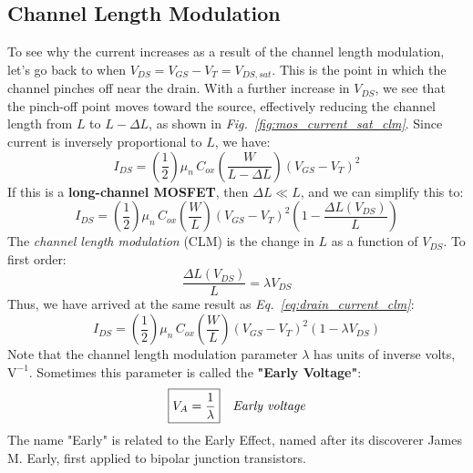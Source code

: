 \subsection{Channel Length Modulation} \label{sec:mos_clm}
To see why the current increases as a result of the channel length modulation, let's go back to when $V_{DS} = V_{GS} - V_T = V_{DS,sat}$.  This is the point in which the channel pinches off near the drain.  With a further increase in $V_{DS}$, we see that the pinch-off point moves toward the source, effectively reducing the channel length from $L$ to $L-\Delta L$, as shown in \emph{Fig.~\ref{fig:mos_current_sat_clm}}.  Since current is inversely proportional to $L$, we have:
    \begin{equation} 
        I_{DS} = \left(\frac{1}{2}\right) \mu_n\,C_{ox} \left(\frac{W}{L - \Delta L}\right) {\left( {V_{GS} - V_T} \right)}^2
    \end{equation}
If this is a \textbf{long-channel MOSFET}, then $\Delta L \ll L$, and we can simplify this to:
    \begin{equation} 
        I_{DS} = \left(\frac{1}{2}\right) \mu_n\,C_{ox} \left(\frac{W}{L}\right)
                    {\left({V_{GS} - V_T}\right)}^2 \left(1 - \frac{\Delta L(V_{DS})}{L}\right)
    \end{equation}
The \textit{channel length modulation} (CLM) is the change in $L$ as a function of $V_{DS}$.  To first order:
    \begin{equation} 
        \frac{\Delta L(V_{DS})}{L} = \lambda V_{DS}
    \end{equation}
Thus, we have arrived at the same result as \emph{Eq.~\ref{eq:drain_current_clm}}:
    \begin{equation} 
        I_{DS} = \left(\frac{1}{2}\right) \mu_n\,C_{ox} \left(\frac{W}{L}\right)
                    {\left({V_{GS} - V_T} \right)}^2 \left(1 - \lambda V_{DS}\right)
    \end{equation}
Note that the channel length modulation parameter $\lambda$ has units of inverse volts, $\mathrm{V^{-1}}$.  Sometimes this parameter is called the \textbf{"Early Voltage"}: 
    \begin{align} 
        \Aboxed{V_A &= \frac{1}{\lambda}}
        &\textit{Early voltage}
        \label{eq:early_voltage}
    \end{align}
The name "Early" is related to the Early Effect, named after its discoverer James M. Early, first applied to bipolar junction transistors.
\newpage
